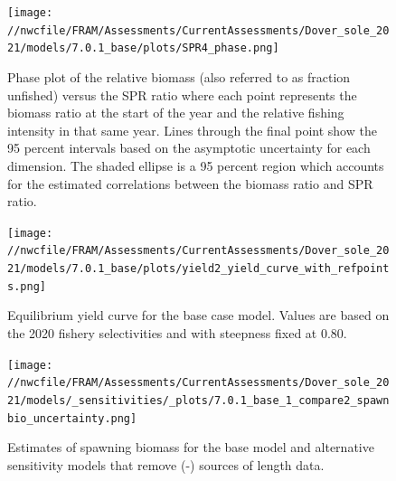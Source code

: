 \documentclass[11pt,
  english,
  a4paper,
]{article}
\begin{document}
\tagmcend\tagstructend


\begin{figure}
\centering
\texttt{[image: //nwcfile/FRAM/Assessments/CurrentAssessments/Dover\_sole\_2021/models/7.0.1\_base/plots/SPR4\_phase.png]}
\caption{Phase plot of the relative biomass (also referred to as fraction unfished) versus the SPR ratio where each point represents the biomass ratio at the start of the year and the relative fishing intensity in that same year. Lines through the final point show the 95 percent intervals based on the asymptotic uncertainty for each dimension. The shaded ellipse is a 95 percent region which accounts for the estimated correlations between the biomass ratio and SPR ratio.\label{fig:phase}}
\end{figure}

\tagmcend\tagstructend


\begin{figure}
\centering
\texttt{[image: //nwcfile/FRAM/Assessments/CurrentAssessments/Dover\_sole\_2021/models/7.0.1\_base/plots/yield2\_yield\_curve\_with\_refpoints.png]}
\caption{Equilibrium yield curve for the base case model. Values are based on the 2020 fishery selectivities and with steepness fixed at 0.80.\label{fig:yield}}
\end{figure}

\tagmcend\tagstructend


\begin{figure}
\centering
\texttt{[image: //nwcfile/FRAM/Assessments/CurrentAssessments/Dover\_sole\_2021/models/\_sensitivities/\_plots/7.0.1\_base\_1\_compare2\_spawnbio\_uncertainty.png]}
\caption{Estimates of spawning biomass for the base model and alternative sensitivity models that remove (-) sources of length data.\label{fig:sens-length-ssb}}
\end{figure}
\end{document}
